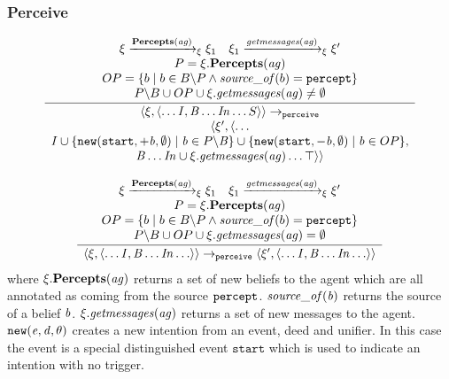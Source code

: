 \subsubsection*{Perceive}
\begin{equation}
  \frac{\begin{array}{c}
      \xi \xrightarrow{\mathbf{Percepts}(\mathit{ag})}_{\xi} \xi_1
\quad \xi_1 \xrightarrow{\mathit{getmessages}(\mathit{ag})}_{\xi} \xi'
\\
P = \xi.\mathbf{Percepts}(\mathit{ag}) \\
OP = \{ b \mid b \in B \backslash P \wedge \mathit{source\_of}(b) =  {\tt percept}\} \\
P \backslash B \cup OP \cup \xi.\mathit{getmessages}(\mathit{ag}) \neq \emptyset
\end{array}
}{
\begin{array}{c}
\langle \xi, \langle \ldots  \mathit{I}, \mathit{B} \ldots \mathit{In} \ldots S \rangle \rangle
\rightarrow_{\tt perceive} \\
\langle \xi', \langle \ldots \\
\mathit{I} \cup \{{\tt new}(\texttt{start}, \mathit{+\mathit{b}}, \emptyset) \mid \mathit{b} \in P \backslash \mathit{B}\} \cup
\{{\tt new}(\texttt{start}, \mathit{-\mathit{b}}, \emptyset) \mid \mathit{b} \in
OP\}, \\ \mathit{B} \ldots 
\mathit{In} \cup \xi.\mathit{getmessages}(\mathit{ag}) \ldots
\top \rangle \rangle
\end{array}
}
\end{equation}

\begin{equation}
  \frac{\begin{array}{c}
      \xi \xrightarrow{\mathbf{Percepts}(\mathit{ag})}_{\xi} \xi_1
\quad \xi_1 \xrightarrow{\mathit{getmessages}(\mathit{ag})}_{\xi} \xi'
\\
P = \xi.\mathbf{Percepts}(\mathit{ag}) \\
OP = \{ b \mid b \in B \backslash P \wedge \mathit{source\_of}(b) =  {\tt percept}\} \\
P \backslash B \cup OP \cup \xi.\mathit{getmessages}(\mathit{ag}) = \emptyset
\end{array}
}{
\begin{array}{c}
\langle \xi, \langle \ldots  \mathit{I}, \mathit{B} \ldots \mathit{In} \ldots \rangle \rangle
\rightarrow_{\tt perceive} 
\langle \xi', \langle \ldots
\mathit{I}, \mathit{B} \ldots 
\mathit{In} \ldots
\rangle \rangle
\end{array}
}
\end{equation}
where $\xi.\mathbf{Percepts}(\mathit{ag})$ returns a set of new beliefs to the agent which are all annotated as coming from the source ${\tt percept}$.
$\mathit{source\_of}(\mathit{b})$ returns the source of a belief $\mathit{b}$.
$\xi.\mathit{getmessages}(\mathit{ag})$ returns a set of new messages to the agent.
${\tt new}(\mathit{e}, \mathit{d}, \theta)$ creates a new intention from an event, deed and unifier.  In this case the event is a special distinguished event $\texttt{start}$ which is used to indicate an intention with no trigger.


